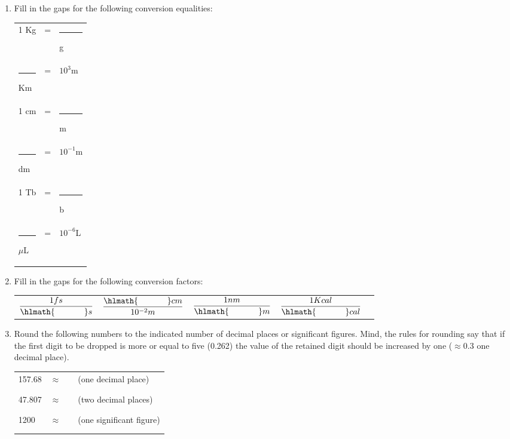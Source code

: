 \documentclass[main.tex]{subfiles}
\begin{document}
\begin{enumerate}
\item Fill in the gaps for the following conversion equalities:\\
\begin{center} \begin{tabular}{ p{3cm} p{1cm}p{3cm}    }
  1 Kg 				&=&\rule{1cm}{0.4pt}g      \\[0.1cm]      
  \rule{1cm}{0.4pt} Km 				&=&$10^{3}$m      \\[0.1cm]      
    1 cm 				&=&\rule{1cm}{0.4pt}m      \\[0.1cm]      
  \rule{1cm}{0.4pt} dm 				&=&$10^{-1}$m      \\[0.1cm]   
    1 Tb 				&=&\rule{1cm}{0.4pt}b      \\[0.1cm]      
  \rule{1cm}{0.4pt} $\mu$L 				&=&$10^{-6}$L      \\[0.1cm]  
 \end{tabular}\end{center}





\item Fill in the gaps for the following conversion factors:\\
\begin{center}
 \begin{tabular}{ p{3cm} p{3cm} p{3cm}p{3cm}p{3cm}   }
 $\dfrac{1fs}{\hlmath{\hspace{35pt }}s}$				&$\dfrac{\hlmath{\hspace{35pt }}cm}{10^{-2}m}$&$\dfrac{1nm}{\hlmath{\hspace{35pt }}m}$&$\dfrac{1Kcal}{\hlmath{\hspace{35pt }}cal}$&   \\[0.1cm]     
 \end{tabular}\end{center}\vspace{.1cm}


\vspace{1cm}
\item Round the following numbers to the indicated number of decimal places or significant figures. Mind, the rules for rounding say that if the first digit to be dropped is more or equal to five (0.262) the value of the retained digit should be increased by one ($\approx 0.3$ one decimal place).
\begin{center} \begin{tabular}{ p{3cm} p{1cm}p{3cm} p{3cm}    }
  157.68				&$\approx$&\rule{2cm}{0.4pt}  & (one decimal place)    \\[0.1cm]      
   47.807 				&$\approx$&\rule{2cm}{0.4pt}  &(two decimal places)    \\[0.1cm]  
      1200 				&$\approx$&\rule{2cm}{0.4pt}  &(one significant figure)    \\[0.1cm]      
    

\end{tabular}
\end{center}
\end{enumerate}
\end{document}
